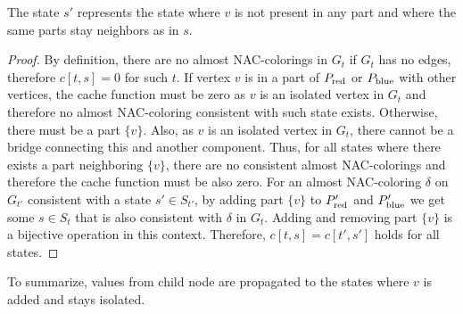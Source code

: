 %
The state \( s' \) represents the state where \( v \) is not present in any part
and where the same parts stay neighbors as in \( s \).
%
\begin{proof}
	By definition, there are no almost NAC-colorings
	in \( G_t \) if \( G_t \) has no edges, therefore \( c[t, s] = 0 \) for such \( t \).
	If vertex \( v \) is in a part of \( P_{\text{red}} \) or \( P_{\text{blue}} \) with other vertices,
	the cache function must be zero as \( v \) is an isolated vertex in \( G_t \)
	and therefore no almost NAC-coloring consistent with such state exists.
	Otherwise, there must be a part \( \{v\} \).
	Also, as \( v \) is an isolated vertex in \( G_t \), there cannot be a bridge
	connecting this and another component.
	Thus, for all states where there exists
	a part neighboring \( \{v\} \), there are no consistent almost NAC-colorings
	and therefore the cache function must be also zero.
	For an almost NAC-coloring \( \delta \) on \( G_{t'} \) consistent with
	a state \( s' \in S_{t'} \),
	by adding part \( \{v\} \) to \( P_{\text{red}}' \) and \( P_{\text{blue}}' \)
	we get some \( s \in S_t \) that is also consistent with \( \delta \) in \( G_t \).
	Adding and removing part \( \{v\} \) is a bijective operation in this context.
	Therefore, \( c[t, s] = c[t', s'] \) holds for all states.
\end{proof}
%
To summarize, values from child node are propagated to the states
where \( v \) is added and stays isolated.

